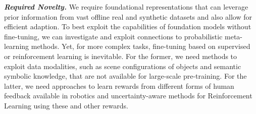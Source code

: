 \documentclass{erc-B2}
\begin{document}



\textit{\textbf{Required Novelty.}} We require foundational representations that can leverage prior information from vast offline real and synthetic datasets and also allow for efficient adaption. 
To best exploit the capabilities of foundation models without fine-tuning, we can investigate and exploit connections to probabilistic meta-learning methods. 
Yet, for more complex tasks, fine-tuning based on supervised or reinforcement learning is inevitable. For the former, we need methods to exploit data modalities, such as scene configurations of objects and semantic symbolic knowledge, that are not available for large-scale pre-training. 
For the latter, we need approaches to learn rewards from different forms of human feedback available in robotics and uncertainty-aware methods for Reinforcement Learning using these and other rewards. 
\end{document}
